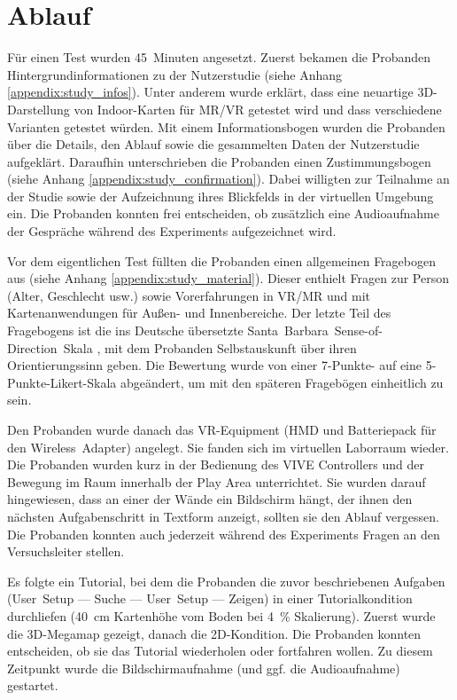 \section{Ablauf}
Für einen Test wurden \num{45}~Minuten angesetzt.
Zuerst bekamen die Probanden Hintergrundinformationen zu der Nutzerstudie (siehe Anhang \autoref{appendix:study_infos}).
Unter anderem wurde erklärt, dass eine neuartige 3D-Darstellung von Indoor-Karten für MR/VR getestet wird und dass verschiedene Varianten getestet würden.
Mit einem Informationsbogen wurden die Probanden über die Details, den Ablauf sowie die gesammelten Daten der Nutzerstudie aufgeklärt.
Daraufhin unterschrieben die Probanden einen Zustimmungsbogen (siehe Anhang \autoref{appendix:study_confirmation}).
Dabei willigten zur Teilnahme an der Studie sowie der Aufzeichnung ihres Blickfelds in der virtuellen Umgebung ein.
Die Probanden konnten frei entscheiden, ob zusätzlich eine Audioaufnahme der Gespräche während des Experiments aufgezeichnet wird.
 
Vor dem eigentlichen Test füllten die Probanden einen allgemeinen Fragebogen aus (siehe Anhang \autoref{appendix:study_material}).
Dieser enthielt Fragen zur Person (Alter, Geschlecht usw.) sowie Vorerfahrungen in VR/MR und mit Kartenanwendungen für Außen- und Innenbereiche. Der letzte Teil des Fragebogens ist die ins Deutsche übersetzte Santa~Barbara~Sense-of-Direction~Skala \parencite{Hegarty2002}, mit dem Probanden Selbstauskunft über ihren Orientierungssinn geben.
Die Bewertung wurde von einer 7-Punkte- auf eine 5-Punkte-Likert-Skala abgeändert, um mit den späteren Fragebögen einheitlich zu sein.

Den Probanden wurde danach das VR-Equipment (HMD und Batteriepack für den Wireless~Adapter) angelegt.
Sie fanden sich im virtuellen Laborraum wieder.
Die Probanden wurden kurz in der Bedienung des VIVE Controllers und der Bewegung im Raum innerhalb der Play Area unterrichtet.
Sie wurden darauf hingewiesen, dass an einer der Wände ein Bildschirm hängt, der ihnen den nächsten Aufgabenschritt in Textform anzeigt, sollten sie den Ablauf vergessen.
Die Probanden konnten auch jederzeit während des Experiments Fragen an den Versuchsleiter stellen.

Es folgte ein Tutorial, bei dem die Probanden die zuvor beschriebenen Aufgaben (User~Setup --- Suche --- User~Setup --- Zeigen) in einer Tutorialkondition durchliefen (\SI{40}{\cm} Kartenhöhe vom Boden bei \SI{4}{\percent} Skalierung).
Zuerst wurde die 3D-Megamap gezeigt, danach die 2D-Kondition.
Die Probanden konnten entscheiden, ob sie das Tutorial wiederholen oder fortfahren wollen.
Zu diesem Zeitpunkt wurde die Bildschirmaufnahme (und ggf. die Audioaufnahme) gestartet.

